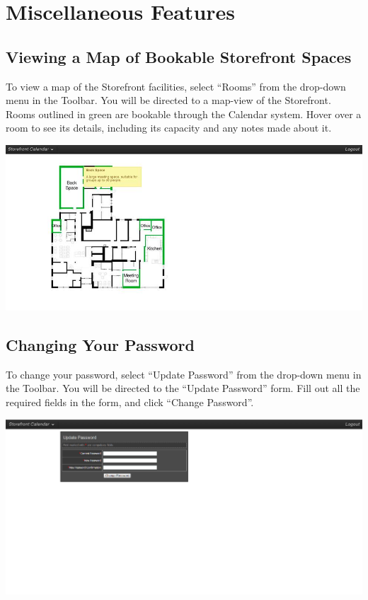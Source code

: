 \section{Miscellaneous Features}


\subsection{Viewing a Map of Bookable Storefront Spaces}

To view a map of the Storefront facilities, select ``Rooms'' from the drop-down menu in the Toolbar. You will be directed to a map-view of the Storefront. Rooms outlined in green are bookable through the Calendar system. Hover over a room to see its details, including its capacity and any notes made about it.

\includegraphics[width=\linewidth]{screenshots/img_map}

\newpage


\subsection{Changing Your Password}

To change your password, select ``Update Password'' from the drop-down menu in the Toolbar. You will be directed to the ``Update Password'' form. Fill out all the required fields in the form, and click ``Change Password''.

\includegraphics[width=\linewidth]{screenshots/img_password}

